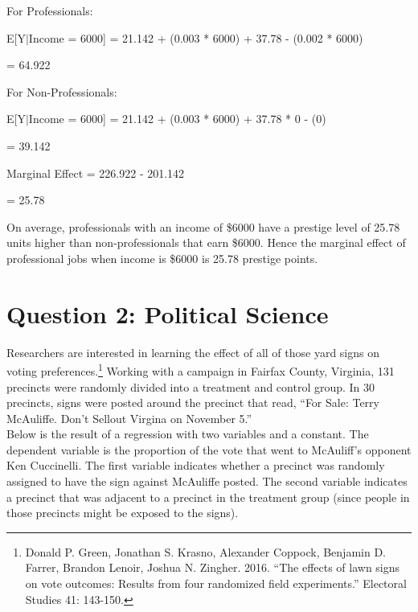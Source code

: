 \documentclass[12pt,letterpaper]{article}
\begin{document}
\begin{enumerate}
	\noindent
	
	For Professionals:
	
	E[Y$|$Income = 6000] = 21.142 + (0.003 * 6000) + 37.78 - (0.002 * 6000)
	
	= 64.922
	\vspace*{0.5cm}
	
	For Non-Professionals:
	
	E[Y$|$Income = 6000] = 21.142 + (0.003 * 6000) + 37.78 * 0 - (0)
	
	= 39.142
	
	\vspace*{0.5cm}
	Marginal Effect = 226.922 - 201.142
	
	= 25.78
	
	\vspace*{0.5cm}
	On average, professionals with an income of \$6000 have a prestige level of 25.78 units higher than non-professionals that earn \$6000. Hence the marginal effect of professional jobs when income is \$6000 is 25.78
	prestige points.
	
\end{enumerate}

\newpage

\section*{Question 2: Political Science}
\vspace{.25cm}
\noindent 	Researchers are interested in learning the effect of all of those yard signs on voting preferences.\footnote{Donald P. Green, Jonathan	S. Krasno, Alexander Coppock, Benjamin D. Farrer,	Brandon Lenoir, Joshua N. Zingher. 2016. ``The effects of lawn signs on vote outcomes: Results from four randomized field experiments.'' Electoral Studies 41: 143-150. } Working with a campaign in Fairfax County, Virginia, 131 precincts were randomly divided into a treatment and control group. In 30 precincts, signs were posted around the precinct that read, ``For Sale: Terry McAuliffe. Don't Sellout Virgina on November 5.'' \\

Below is the result of a regression with two variables and a constant.  The dependent variable is the proportion of the vote that went to McAuliff's opponent Ken Cuccinelli. The first variable indicates whether a precinct was randomly assigned to have the sign against McAuliffe posted. The second variable indicates
a precinct that was adjacent to a precinct in the treatment group (since people in those precincts might be exposed to the signs).  \\
\end{document}
